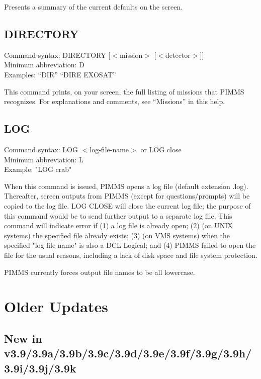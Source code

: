 \documentclass[11pt]{article}
\begin{document}
\begin{appendices}
Presents a summary of the current defaults on the screen.

\subsection{DIRECTORY}

Command syntax: DIRECTORY [$<$mission$>$ [$<$detector$>$]] \\
Minimum abbreviation: D \\
Examples: ``DIR'' ``DIRE EXOSAT'' \\
\vspace{0.5 cm}

This command prints, on your screen, the full listing of missions that PIMMS
recognizes.  For explanations and comments, see ``Missions'' in this help.

\subsection{LOG}

Command syntax: LOG $<$log-file-name$>$ or LOG close \\
Minimum abbreviation: L \\
Example: "LOG crab" \\
\vspace{0.5 cm}

When this command is issued, PIMMS opens a log file (default extension
.log).  Thereafter, screen outputs from PIMMS (except for questions/prompts)
will be copied to the log file.  LOG CLOSE will close the current log file;
the purpose of this command would be to send further output to a separate
log file.  This command will indicate error if (1) a log file is already
open; (2) (on UNIX systems) the specified file already exists; (3) (on
VMS systems) when the specified "log file name" is also a DCL Logical;
and (4) PIMMS failed to open the file for the usual reasons, including
a lack of disk space and file system protection.

PIMMS currently forces output file names to be all lowercase.

\pagebreak

\section{Older Updates}

\subsection{New in v3.9/3.9a/3.9b/3.9c/3.9d/3.9e/3.9f/3.9g/3.9h/3.9i/3.9j/3.9k}


\end{appendices}
\end{document}
